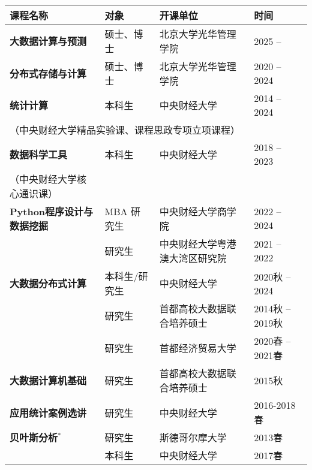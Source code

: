 \documentclass[twoside,a4paper,11pt]{article}
\begin{document}
\begin{tabular}{l l ll}
  \toprule
  课程名称                                  & 对象          & 开课单位                       & 时间             \\
  \midrule
  \textbf{大数据计算与预测}                 & 硕士、博士    & 北京大学光华管理学院           & 2025 --          \\
  \textbf{分布式存储与计算}                 & 硕士、博士    & 北京大学光华管理学院           & 2020 -- 2024     \\

  \textbf{统计计算}                         & 本科生        & 中央财经大学                   & 2014 -- 2024     \\
  \multicolumn{4}{l}{\footnotesize（中央财经大学精品实验课、课程思政专项立项课程）}                             \\
  \textbf{数据科学工具}                     & 本科生        & 中央财经大学                   & 2018 -- 2023     \\
  \footnotesize{（中央财经大学核心通识课）} &               &                                &                  \\
  \textbf{Python程序设计与数据挖掘}         & MBA 研究生    & 中央财经大学商学院             & 2022 -- 2024     \\
                                            & 研究生        & 中央财经大学粤港澳大湾区研究院 & 2021 -- 2022     \\
  \textbf{大数据分布式计算}                 & 本科生/研究生 & 中央财经大学                   & 2020秋 -- 2024   \\
                                            & 研究生        & 首都高校大数据联合培养硕士     & 2014秋 -- 2019秋 \\
                                            & 研究生        & 首都经济贸易大学               & 2020春 --2021春        \\
  \textbf{大数据计算机基础}                 & 研究生        & 首都高校大数据联合培养硕士     & 2015秋           \\
  \textbf{应用统计案例选讲}                 & 研究生        & 中央财经大学                   & 2016-2018春      \\
  \textbf{贝叶斯分析}$^*$                   & 研究生        & 斯德哥尔摩大学                 & 2013春           \\
                                            & 本科生        & 中央财经大学                   & 2017春           \\

\end{tabular}
\end{document}
